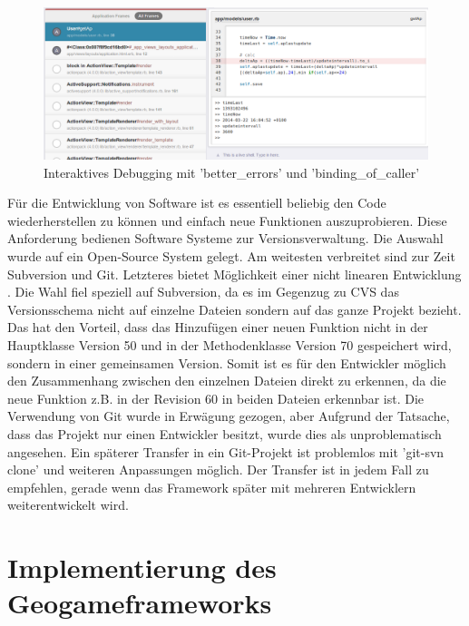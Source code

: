\begin{figure}[H]
\begin{center}
\includegraphics[width=155mm]{images/ch5_img08_livebinding.png}
\caption{Interaktives Debugging mit 'better\_errors' und 'binding\_of\_caller'}
\label{img:ch5_img08_livebinding}
\end{center}
\end{figure}

Für die Entwicklung von Software ist es essentiell beliebig den Code wiederherstellen zu können und einfach neue Funktionen auszuprobieren. Diese Anforderung bedienen Software Systeme zur Versionsverwaltung. 
Die Auswahl wurde auf ein Open-Source System gelegt. Am weitesten verbreitet sind zur Zeit Subversion und Git. Letzteres bietet Möglichkeit einer nicht linearen Entwicklung \cite{Bird.2009}.
Die Wahl fiel speziell auf Subversion, da es im Gegenzug zu CVS das Versionsschema nicht auf einzelne Dateien sondern auf das ganze Projekt bezieht.
Das hat den Vorteil, dass das Hinzufügen einer neuen Funktion nicht in der Hauptklasse Version 50 und in der Methodenklasse Version 70 gespeichert wird, sondern in einer gemeinsamen Version.
Somit ist es für den Entwickler möglich den Zusammenhang zwischen den einzelnen Dateien direkt zu erkennen, da die neue Funktion z.B. in der Revision 60 in beiden Dateien erkennbar ist.
Die Verwendung von Git wurde in Erwägung gezogen, aber Aufgrund der Tatsache, dass das Projekt nur einen Entwickler besitzt, wurde dies als unproblematisch angesehen. Ein späterer Transfer in ein Git-Projekt ist problemlos mit 'git-svn clone' und weiteren Anpassungen möglich. Der Transfer ist in jedem Fall zu empfehlen, gerade wenn das Framework später mit mehreren Entwicklern weiterentwickelt wird.

\section{Implementierung des Geogameframeworks}
\label{ch5:s:Implementierung}

